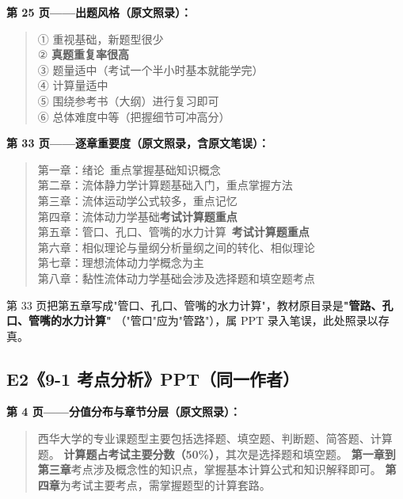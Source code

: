 \noindent\textbf{第 25 页——出题风格（原文照录）：}

\begin{quote}\small
① 重视基础，新题型很少\\
② \textbf{真题重复率很高}\\
③ 题量适中（考试一个半小时基本就能学完）\\
④ 计算量适中\\
⑤ 围绕参考书（大纲）进行复习即可\\
⑥ 总体难度中等（把握细节可冲高分）
\end{quote}

\noindent\textbf{第 33 页——逐章重要度（原文照录，含原文笔误）：}

\begin{quote}\small
第一章：绪论\qquad\qquad\qquad\qquad\ 重点掌握基础知识概念\\
第二章：流体静力学\qquad\qquad\qquad 计算题基础入门，重点掌握方法\\
第三章：流体运动学\qquad\qquad\qquad 公式较多，重点记忆\\
第四章：流体动力学基础\qquad\qquad \textbf{考试计算题重点}\\
第五章：管口、孔口、管嘴的水力计算\quad\ \textbf{考试计算题重点}\\
第六章：相似理论与量纲分析\qquad\quad 量纲之间的转化、相似理论\\
第七章：理想流体动力学\qquad\qquad\quad 概念为主\\
第八章：黏性流体动力学基础\qquad\quad 会涉及选择题和填空题考点
\end{quote}

\begin{yicuo}
第 33 页把第五章写成"管口、孔口、管嘴的水力计算"，教材原目录是\textbf{"管路、孔口、管嘴的水力计算"}
（"管口"应为"管路"），属 PPT 录入笔误，此处照录以存真。
\end{yicuo}

\subsection*{E2\quad《9-1 考点分析》PPT（同一作者）}

\noindent\textbf{第 4 页——分值分布与章节分层（原文照录）：}

\begin{quote}\small
西华大学的专业课题型主要包括选择题、填空题、判断题、简答题、计算题。
\textbf{计算题占考试主要分数（50\%）}，其次是选择题和填空题。
\textbf{第一章到第三章}考点涉及概念性的知识点，掌握基本计算公式和知识解释即可。
\textbf{第四章}为考试主要考点，需掌握题型的计算套路。
\end{quote}

